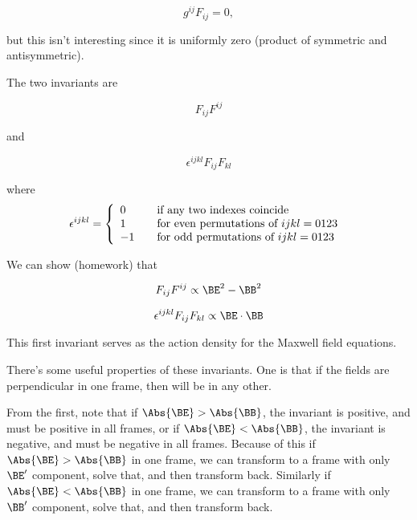 \begin{equation}\label{eqn:relativisticElectrodynamicsL11:550}
g^{i j} F_{i j} = 0,
\end{equation}

but this isn't interesting since it is uniformly zero (product of symmetric and antisymmetric).

The two invariants are

\begin{equation}\label{eqn:relativisticElectrodynamicsL11:570}
F_{i j}F^{i j}
\end{equation}

and 

\begin{equation}\label{eqn:relativisticElectrodynamicsL11:590}
\epsilon^{ijkl} F_{i j}F_{k l}
\end{equation}

where
\begin{equation}\label{eqn:relativisticElectrodynamicsL11:610}
\epsilon^{ijkl} =
\left\{
\begin{array}{l l}
0 & \quad \mbox{if any two indexes coincide} \\
1 & \quad \mbox{for even permutations of $ijkl=0123$ } \\
-1 & \quad \mbox{for odd permutations of $ijkl=0123$ } \\
\end{array}
\right.
\end{equation}

We can show (homework) that

\begin{equation}\label{eqn:relativisticElectrodynamicsL11:630}
F_{i j}F^{i j} \propto \BE^2 - \BB^2
\end{equation}

\begin{equation}\label{eqn:relativisticElectrodynamicsL11:650}
\epsilon^{ijkl} F_{i j}F_{k l} \propto \BE \cdot \BB
\end{equation}

This first invariant serves as the action density for the Maxwell field equations.

There's some useful properties of these invariants.  One is that if the fields are perpendicular in one frame, then will be in any other.  

From the first, note that if $\Abs{\BE} > \Abs{\BB}$, the invariant is positive, and must be positive in all frames, or if $\Abs{\BE} < \Abs{\BB}$, the invariant is negative, and must be negative in all frames.  Because of this if $\Abs{\BE} > \Abs{\BB}$ in one frame, we can transform to a frame with only $\BE'$ component, solve that, and then transform back.  Similarly if $\Abs{\BE} < \Abs{\BB}$ in one frame, we can transform to a frame with only $\BB'$ component, solve that, and then transform back.

